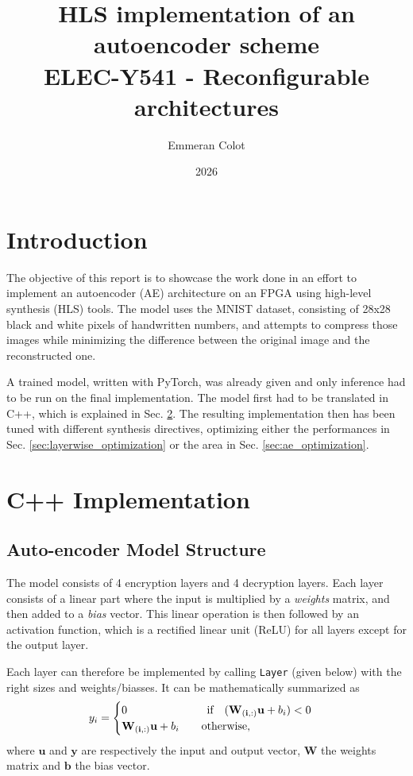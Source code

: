 \documentclass[11pt,a4paper]{article}
\title{HLS implementation of an autoencoder scheme\\
\large \textbf{ELEC-Y541} - Reconfigurable architectures}
\author{%
  Emmeran Colot
}
\date{2026}
\begin{document}
\maketitle

\section{Introduction}

The objective of this report is to showcase the work done in an effort to implement an autoencoder (AE) architecture on an FPGA using high-level synthesis (HLS) tools. The model uses the MNIST dataset, consisting of 28x28 black and white pixels of handwritten numbers, and attempts to compress those images while minimizing the difference between the original image and the reconstructed one.

A trained model, written with PyTorch, was already given and only inference had to be run on the final implementation. The model first had to be translated in C++, which is explained in Sec. \ref{sec:c++_implementation}. The resulting implementation then has been tuned with different synthesis directives, optimizing either the performances in Sec. \ref{sec:layerwise_optimization} or the area in Sec. \ref{sec:ae_optimization}.

\section{C++ Implementation}
\label{sec:c++_implementation}

\subsection{Auto-encoder Model Structure}
The model consists of 4 encryption layers and 4 decryption layers. Each layer consists of a linear part where the input is multiplied by a \textit{weights} matrix, and then added to a \textit{bias} vector. This linear operation is then followed by an activation function, which is a rectified linear unit (ReLU) for all layers except for the output layer.

Each layer can therefore be implemented by calling \lstinline[style=cppstyle]{Layer} (given below) with the right sizes and weights/biasses. It can be mathematically summarized as
\begin{equation}
    y_i = \begin{cases}
        0 \hspace{2.53cm} \text{if} \quad (\mathbf{W_{(i, :)}} \mathbf{u} + b_i) < 0\\
        \mathbf{W_{(i, :)}} \mathbf{u} + b_i \qquad \text{otherwise},
    \end{cases}
\end{equation}
where $\mathbf{u}$ and $\mathbf{y}$ are respectively the input and output vector, $\mathbf{W}$ the weights matrix and $\mathbf{b}$ the bias vector.
\end{document}

